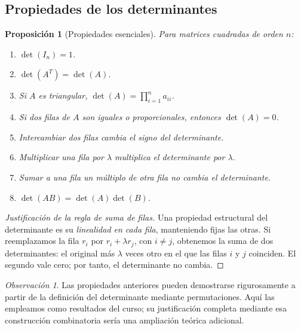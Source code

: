 \documentclass[12pt]{article}
\newtheorem{proposicion}[definicion]{Proposición}
\theoremstyle{remark}
\newtheorem{observacion}[definicion]{Observación}
\begin{document}
\subsection{Propiedades de los determinantes}
\begin{proposicion}[Propiedades esenciales]
Para matrices cuadradas de orden $n$:
\begin{enumerate}
\item $\det(I_n)=1$.
\item $\det(A^T)=\det(A)$.
\item Si $A$ es triangular, $\det(A)=\prod_{i=1}^{n}a_{ii}$.
\item Si dos filas de $A$ son iguales o proporcionales, entonces $\det(A)=0$.
\item Intercambiar dos filas cambia el signo del determinante.
\item Multiplicar una fila por $\lambda$ multiplica el determinante por $\lambda$.
\item Sumar a una fila un múltiplo de otra fila \emph{no cambia} el determinante.
\item $\det(AB)=\det(A)\det(B)$.
\end{enumerate}
\end{proposicion}

\begin{proof}[Justificación de la regla de suma de filas]
Una propiedad estructural del determinante es su \emph{linealidad en cada fila}, manteniendo fijas las otras. Si reemplazamos la fila $r_i$ por $r_i+\lambda r_j$, con $i\ne j$, obtenemos la suma de dos determinantes: el original más $\lambda$ veces otro en el que las filas $i$ y $j$ coinciden. El segundo vale cero; por tanto, el determinante no cambia.
\end{proof}

\begin{observacion}
Las propiedades anteriores pueden demostrarse rigurosamente a partir de la definición del determinante mediante permutaciones. Aquí las empleamos como resultados del curso; su justificación completa mediante esa construcción combinatoria sería una ampliación teórica adicional.
\end{observacion}
\end{document}
